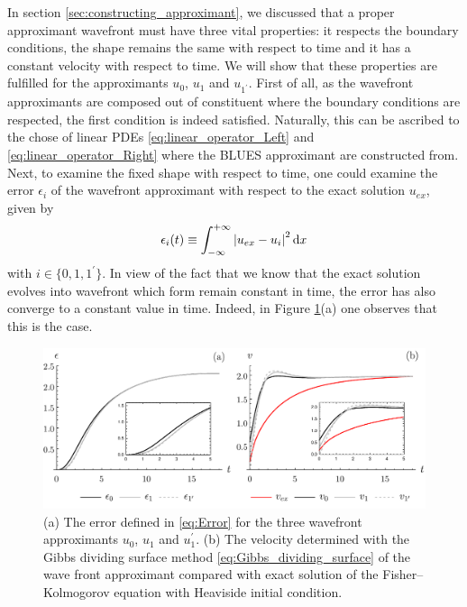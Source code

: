 \documentclass[amsmath,amssymb,amsfonts,aps,pre,preprint,superscriptaddress,bibnotes,showpacs,showkeys,longbibliography]{revtex4-1}
\begin{document}
In section \ref{sec:constructing_approximant}, we discussed that a proper approximant wavefront must have three vital properties: it respects the boundary conditions, the shape remains the same with respect to time and it has a constant velocity with respect to time. We will show that these properties are fulfilled for the approximants $u_0$, $u_1$ and $u_{1^\prime}$. First of all, as the wavefront approximants are composed out of constituent where the boundary conditions are respected, the first condition is indeed satisfied. Naturally, this can be ascribed to the chose of linear PDEs \eqref{eq:linear_operator_Left} and \eqref{eq:linear_operator_Right} where the BLUES approximant are constructed from. Next, to examine the fixed shape with respect to time, one could examine the error $\epsilon_i$ of the wavefront approximant with respect to the exact solution $u_{ex}$, given by
\begin{align}\label{eq:Error}
    \epsilon_i(t) \equiv \int_{-\infty}^{+\infty}  \abs{u_{ex}-u_i}^2\dd{x}
\end{align}
with $i\in \{0,1,1^\prime \}$. In view of the fact that we know that the exact solution evolves into wavefront which form remain constant in time, the error has also converge to a constant value in time. Indeed, in Figure \ref{fig:ErrorVelocityGrid}(a) one observes that this is the case. 
\begin{figure}[!h]
    \centering
    \includegraphics[width=\linewidth]{Figures/ErrorVelocityGrid.pdf}
    \caption{(a) The error defined in \eqref{eq:Error} for the three wavefront approximants $u_0$, $u_1$ and $u_1^\prime$. (b) The velocity determined with the Gibbs dividing surface method \eqref{eq:Gibbs_dividing_surface} of the wave front approximant compared with exact solution of the Fisher–Kolmogorov equation with Heaviside initial condition. }
    \label{fig:ErrorVelocityGrid}
\end{figure}
\end{document}
